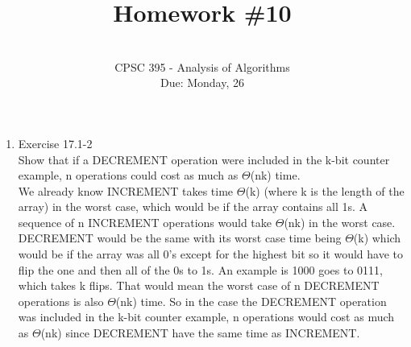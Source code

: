 \documentclass[12pt]{article}
\begin{document}
 
 
 
\title{Homework \#10}%
\author{\\ %
CPSC 395 - Analysis of Algorithms
\\ Due: Monday, 26} %
\date{}
\maketitle

\begin{enumerate}
\item Exercise 17.1-2 \\
Show that if a DECREMENT operation were included in the k-bit counter example, n operations could cost as much as $\Theta$(nk) time. \\
We already know INCREMENT takes time $\Theta$(k) (where k is the length of the array) in the worst case, which would be if the array contains all 1s. A sequence of n INCREMENT operations would take $\Theta$(nk) in the worst case. DECREMENT would be the same with its worst case time being $\Theta$(k) which would be if the array was all 0's except for the highest bit so it would have to flip the one and then all of the 0s to 1s. An example is 1000 goes to 0111, which takes k flips. That would mean the worst case of n DECREMENT operations is also $\Theta$(nk) time. So in the case the DECREMENT operation was included in the k-bit counter example, n operations would cost as much as $\Theta$(nk) since DECREMENT have the same time as INCREMENT.


\end{enumerate}
\end{document}
